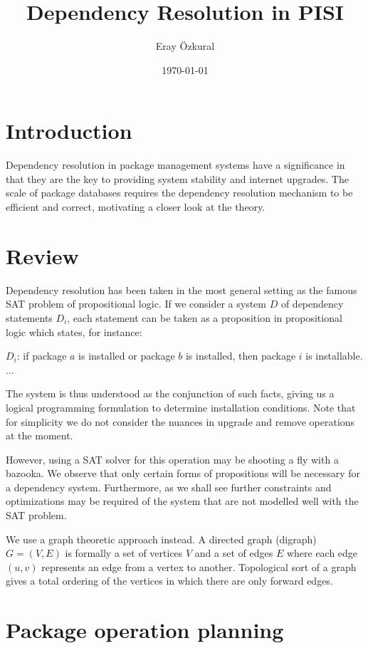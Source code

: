 \documentclass[a4paper,11pt]{article}
\title{ Dependency Resolution in PISI}
\author{Eray \"{O}zkural}
\date{\today}
\begin{document}
\maketitle

\section{Introduction}

Dependency resolution in package management systems have a
significance in that they are the key to providing system stability
and internet upgrades. The scale of package databases requires the
dependency resolution mechanism to be efficient and correct,
motivating a closer look at the theory.


\section{Review}

Dependency resolution has been taken in the most general setting as
the famous SAT problem of propositional logic. If we consider a system
$D$ of dependency statements $D_i$, each statement can be taken as a
proposition in propositional logic which states, for instance:

$D_i$: if package $a$ is installed or package $b$ is installed, then
package $i$ is installable.\\
...

The system is thus understood as the conjunction of such facts, giving
us a logical programming formulation to determine installation
conditions. Note that for simplicity we do not consider the nuances in
upgrade and remove operations at the moment.

However, using a SAT solver for this operation may be shooting a fly
with a bazooka. We observe that only certain forms of propositions
will be necessary for a dependency system. Furthermore, as we shall
see further constraints and optimizations may be required of the
system that are not modelled well with the SAT problem.

We use a graph theoretic approach instead. A directed graph (digraph)
$G=(V,E)$ is formally a set of vertices $V$ and a set of edges $E$
where each edge $(u,v)$ represents an edge from a vertex to
another. Topological sort of a graph gives a total ordering of the
vertices in which there are only forward edges. 

\section{Package operation planning}
\end{document}
